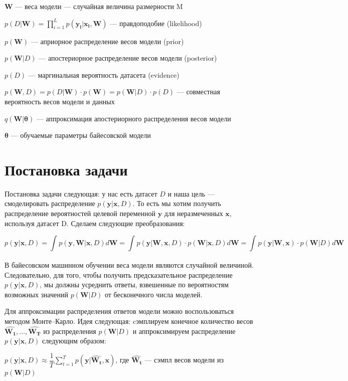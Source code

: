 \documentclass{article}
\begin{document}
$\mathbf{W}$ --- веса модели --- случайная величина размерности M

$p(D | \mathbf{W}) = \prod_{i=1}^{L} p(\mathbf{y_i} | \mathbf{x_i}, \mathbf{W})$ — правдоподобие (likelihood)

$p(\mathbf{W})$ --- априорное распределение весов модели (prior)

$p(\mathbf{W}| D)$ --- апостериорное распределение весов модели (posterior)

$p(D)$ --- маргинальная вероятность датасета (evidence)

$p(\mathbf{W}, D) =
p(D | \mathbf{W}) \cdot p(\mathbf{W}) =
p(\mathbf{W}| D)\cdot p(D)$
--- совместная вероятность весов модели и данных

$q(\mathbf{W} | \pmb{\theta})$ --- аппроксимация апостериорного распределения весов модели

$\pmb{\theta}$ --- обучаемые параметры байесовской модели

\section{Постановка задачи}
Постановка задачи следующая: у нас есть датасет $D$ и наша цель — смоделировать распределение $p(\mathbf{y} | \mathbf{x}, D)$. То есть мы хотим получить распределение вероятностей целевой переменной $\mathbf{y}$ для неразмеченных $\mathbf{x}$, используя датасет D. Сделаем следующие преобразования:

\[
p(\mathbf{y} | \mathbf{x}, D) =
\int_{}{} p(\mathbf{y}, \mathbf{W} | \mathbf{x}, D) d\mathbf{W} =
\int_{}{} p(\mathbf{y} | \mathbf{W}, \mathbf{x}, D) \cdot p(\mathbf{W} | \mathbf{x}, D) d\mathbf{W} =
\int_{}{} p(\mathbf{y} | \mathbf{W}, \mathbf{x}) \cdot p(\mathbf{W} | D) d\mathbf{W}
\]

В байесовском машинном обучении веса модели являются случайной величиной. Следовательно, для того, чтобы получить предсказательное распределение $p(\mathbf{y} | \mathbf{x}, D)$, мы должны усреднить ответы, взвешенные по вероятностям возможных значений $p(\mathbf{W} | D)$ от бесконечного числа моделей.

Для аппроксимации распределения ответов модели можно воспользоваться методом Монте--Карло. Идея следующая: cэмплируем конечное количество весов $\hat{\mathbf{W_1}}, \dots, \hat{\mathbf{W_T}}$ из распределения $p(\mathbf{W}| D)$  и аппроксимируем распределение $p(\mathbf{y} | \mathbf{x}, D)$ следующим образом:

$
p(\mathbf{y} | \mathbf{x}, D)
\approx \dfrac{1}{T} \sum_{t=1}^{T}{p(\mathbf{y} | \hat{\mathbf{W_t}}, \mathbf{x})}
$, где $\hat{\mathbf{W_t}}$ --- сэмпл весов модели из $p(\mathbf{W}| D)$
\end{document}
